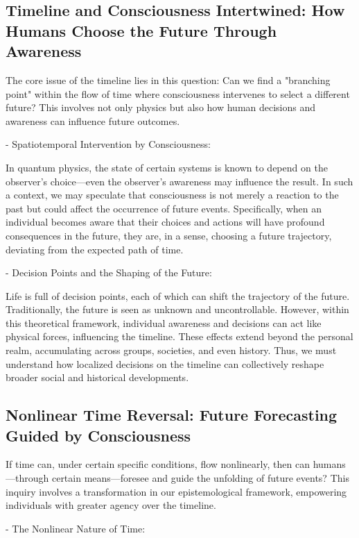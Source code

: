 \documentclass{article}
\begin{document}
\subsection{Timeline and Consciousness Intertwined: How Humans Choose the Future Through Awareness}

The core issue of the timeline lies in this question: Can we find a "branching point" within the flow of time where consciousness intervenes to select a different future? This involves not only physics but also how human decisions and awareness can influence future outcomes.

- Spatiotemporal Intervention by Consciousness:

In quantum physics, the state of certain systems is known to depend on the observer's choice—even the observer’s awareness may influence the result. In such a context, we may speculate that consciousness is not merely a reaction to the past but could affect the occurrence of future events. Specifically, when an individual becomes aware that their choices and actions will have profound consequences in the future, they are, in a sense, choosing a future trajectory, deviating from the expected path of time.

- Decision Points and the Shaping of the Future:

Life is full of decision points, each of which can shift the trajectory of the future. Traditionally, the future is seen as unknown and uncontrollable. However, within this theoretical framework, individual awareness and decisions can act like physical forces, influencing the timeline. These effects extend beyond the personal realm, accumulating across groups, societies, and even history. Thus, we must understand how localized decisions on the timeline can collectively reshape broader social and historical developments.

\subsection{Nonlinear Time Reversal: Future Forecasting Guided by Consciousness}

If time can, under certain specific conditions, flow nonlinearly, then can humans—through certain means—foresee and guide the unfolding of future events? This inquiry involves a transformation in our epistemological framework, empowering individuals with greater agency over the timeline.

- The Nonlinear Nature of Time:
\end{document}

